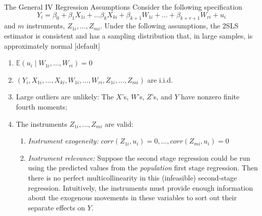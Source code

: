 \documentclass[notes,10pt, aspectratio=169]{beamer}
\begin{document}
\begin{frame}{The General IV Regression Assumptions}
Consider the following specification
\begin{equation*}
    Y_i = \beta_0 + \beta_1 X_{1i} + \dots   \beta_k X_{ki} +  \beta_{k+1} W_{1i} + \dots + \beta_{k+r+1} W_{ri} + u_i
\end{equation*}
and $m$ instruments, $Z_{1i}, \dots,Z_{mi}$. Under the following assumptions, the 2SLS estimator is consistent and has a sampling distribution that, in large samples, is approximately normal
[default]
\begin{enumerate}
    \item $\mathbb{E}(u_i\mid W_{1i}, \dots, W_{ri}) = 0$ 
    \item $(Y_i, X_{1i},  \dots , X_{ki}, W_{1i}, \dots, W_{ri},Z_{1i}, \dots,Z_{mi})$ are i.i.d.
    \item Large outliers are unlikely: The $X$’s, $W$’s, $Z$’s, and $Y$ have nonzero finite fourth moments;
    \item The instruments $Z_{1i}, \dots,Z_{mi}$ are valid:
    \begin{enumerate}
        \item \textit{Instrument exogeneity:} $corr(Z_{1i}, u_i)=0, \dots, corr(Z_{mi}, u_i)=0$
        \item \textit{Instrument relevance:} Suppose the second stage regression could be run using the predicted values from the \textit{population} first stage regression. Then there is no perfect multicollinearity in this (infeasible) second-stage regression. Intuitively, the instruments must provide enough information about the exogenous movements in these variables to sort out their separate effects on $Y$.
    \end{enumerate}
\end{enumerate}
\end{frame}
\end{document}
